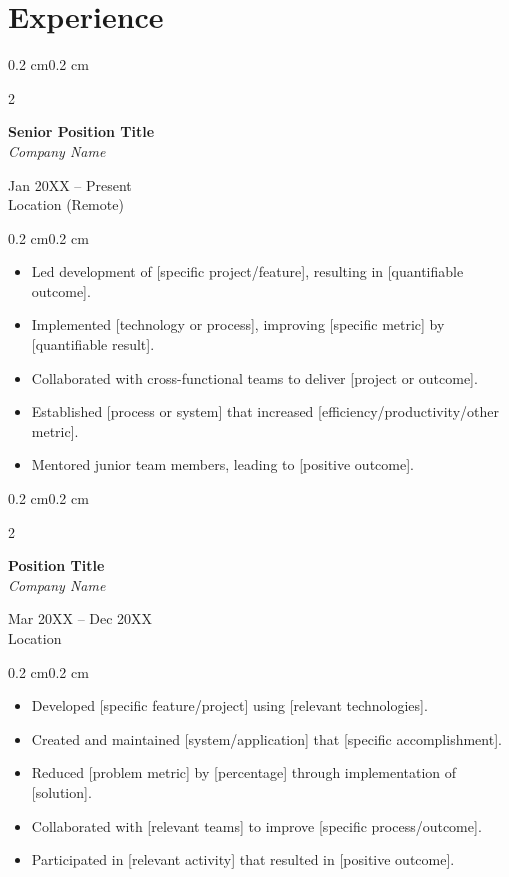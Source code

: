 \documentclass[11pt, letterpaper]{article}
\newenvironment{highlights}{
    \begin{itemize}[
        topsep=0.10 cm,
        parsep=0.10 cm,
        partopsep=0pt,
        itemsep=0pt,
        leftmargin=0.4 cm + 10pt
    ]
}{
    \end{itemize}
} %
\newenvironment{onecolentry}{
    \begin{adjustwidth}{0.2 cm}{0.2 cm}
}{
    \end{adjustwidth}
} %
\newenvironment{twocolentry}[2][]{
    \onecolentry
    \def\secondColumn{#2}
    \setcolumnwidth{\fill, 4.5 cm}
    \begin{paracol}{2}
}{
    \switchcolumn \raggedleft \secondColumn
    \end{paracol}
    \endonecolentry
} %
\begin{document}
    \section{Experience}
    \begin{twocolentry}{
        Jan 20XX -- Present \\
        Location (Remote)
    }
        \textbf{Senior Position Title}\\[0.2cm]
        \textit{Company Name}
    \end{twocolentry}
    \vspace{0.10 cm}
    \begin{onecolentry}
        \begin{highlights}
            \item Led development of [specific project/feature], resulting in [quantifiable outcome].
            \item Implemented [technology or process], improving [specific metric] by [quantifiable result].
            \item Collaborated with cross-functional teams to deliver [project or outcome].
            \item Established [process or system] that increased [efficiency/productivity/other metric].
            \item Mentored junior team members, leading to [positive outcome].
        \end{highlights}
    \end{onecolentry}
    \vspace{0.3 cm}
    \begin{twocolentry}{
        Mar 20XX -- Dec 20XX \\
        Location
    }
        \textbf{Position Title}\\[0.2cm]
        \textit{Company Name}
    \end{twocolentry}
    \vspace{0.10 cm}
    \begin{onecolentry}
        \begin{highlights}
            \item Developed [specific feature/project] using [relevant technologies].
            \item Created and maintained [system/application] that [specific accomplishment].
            \item Reduced [problem metric] by [percentage] through implementation of [solution].
            \item Collaborated with [relevant teams] to improve [specific process/outcome].
            \item Participated in [relevant activity] that resulted in [positive outcome].
        \end{highlights}
    \end{onecolentry}
\end{document}
